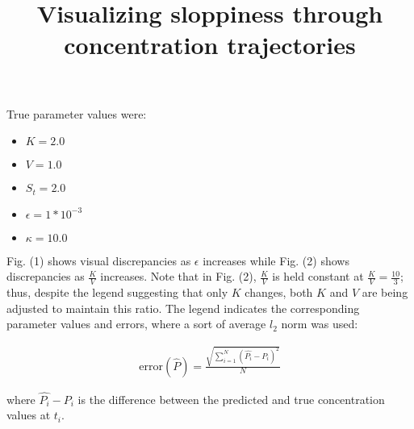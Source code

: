 \documentclass[11pt]{article}
\title{ \vspace{-3cm} Visualizing sloppiness through concentration trajectories}
\begin{document}
\maketitle





True parameter values were:

\begin{itemize}
\item $K = 2.0$
\item $V = 1.0$
\item $S_t = 2.0$
\item $\epsilon = 1*10^{-3}$
\item $\kappa = 10.0$
\end{itemize}


Fig. (1) shows visual discrepancies as $\epsilon$ increases while Fig. (2) shows discrepancies as $\frac{K}{V}$ increases. Note that in Fig. (2), $\frac{K}{V}$ is held constant at $\frac{K}{V} = \frac{10}{3}$; thus, despite the legend suggesting that only $K$ changes, both $K$ and $V$ are being adjusted to maintain this ratio. The legend indicates the corresponding parameter values and errors, where a sort of average $l_2$ norm was used:

\begin{align}
  \textrm{error}(\hat{P}) = \frac{\sqrt{\sum_{i=1}^N (\hat{P_i} - P_i)^2}}{N}
\end{align}

where $\hat{P_i} - P_i$ is the difference between the predicted and true concentration values at $t_i$. \\

\noindent{}
\end{document}
